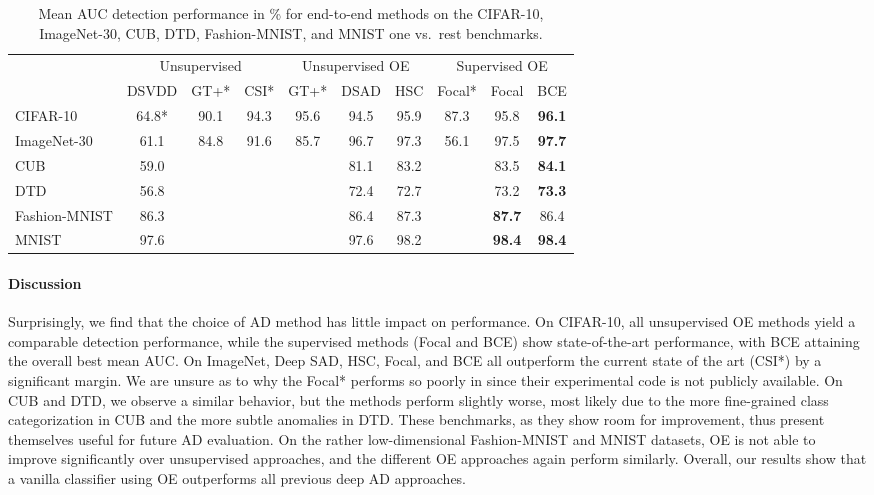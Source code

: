 \documentclass[10pt]{article} \usepackage[accepted]{stylefiles/tmlr}
\begin{document}
\begin{table}[hb]
  \caption{Mean AUC detection performance in \% for end-to-end methods on the CIFAR-10, ImageNet-30, CUB, DTD, Fashion-MNIST, and MNIST one vs.~rest benchmarks.}
  \label{tab:aucs_without_transfer}
  \begin{center}
    \small \begin{tabular}{lccccccccc} 
\toprule 
& \multicolumn{3}{c|}{Unsupervised} & \multicolumn{3}{c|}{Unsupervised OE} & \multicolumn{3}{c}{Supervised OE} \\ 
 & DSVDD & GT+* & \multicolumn{1}{c|}{CSI*} & GT+* & DSAD & \multicolumn{1}{c|}{HSC} & Focal* & Focal & \multicolumn{1}{c}{BCE} \\ 
\midrule 
CIFAR-10 & 64.8* & 90.1 & \multicolumn{1}{c|}{94.3} & 95.6 & 94.5 & \multicolumn{1}{c|}{95.9} & 87.3 & 95.8 & \multicolumn{1}{c}{\bf 96.1} \\ 
ImageNet-30 & 61.1 & 84.8 & \multicolumn{1}{c|}{91.6} & 85.7 & 96.7 & \multicolumn{1}{c|}{97.3} & 56.1 & 97.5 & \bf 97.7  \\
\midrule
CUB & 59.0 &  & \multicolumn{1}{c|}{} &  & 81.1 & \multicolumn{1}{c|}{83.2} &  & 83.5 & \bf 84.1  \\
DTD & 56.8 &  & \multicolumn{1}{c|}{} &  & 72.4 & \multicolumn{1}{c|}{72.7} &  & 73.2 & \bf 73.3  \\
Fashion-MNIST & 86.3 &  & \multicolumn{1}{c|}{} &  & 86.4 & \multicolumn{1}{c|}{87.3} &  & \bf 87.7 & 86.4   \\
MNIST & 97.6 &  & \multicolumn{1}{c|}{} &  & 97.6 & \multicolumn{1}{c|}{98.2} &  & \bf 98.4 & \bf 98.4   \\
\bottomrule 
\end{tabular}    \end{center}
\end{table}



\paragraph{Discussion} 
Surprisingly, we find that the choice of AD method has little impact on performance.
On CIFAR-10, all unsupervised OE methods yield a comparable detection performance, while the supervised methods (Focal and BCE) show state-of-the-art performance, with BCE attaining the overall best mean AUC.
On ImageNet, Deep SAD, HSC, Focal, and BCE all outperform the current state of the art (CSI*) by a significant margin.
We are unsure as to why the Focal* performs so poorly in \citet{hendrycks2019using} since their experimental code is not publicly available. 
On CUB and DTD, we observe a similar behavior, but the methods perform slightly worse, most likely due to the more fine-grained class categorization in CUB and the more subtle anomalies in DTD.
These benchmarks, as they show room for improvement, thus present themselves useful for future AD evaluation. 
On the rather low-dimensional Fashion-MNIST and MNIST datasets, OE is not able to improve significantly over unsupervised approaches, and the different OE approaches again perform similarly.
Overall, our results show that a vanilla classifier using OE outperforms all previous deep AD approaches.
\end{document}
